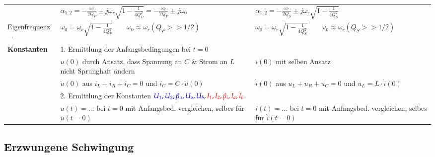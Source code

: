 \begin{tabular}{| p{3.5cm} | p{7.5cm} | p{7cm} |}
		& $\alpha_{1,2} = - \frac{\omega_r}{2 Q_P} \pm j \omega_r \sqrt{1 - \frac{1}{4 Q_P^2}}=-\frac{\omega_r}{2 Q_P} \pm j \omega_0$	
		& $\alpha_{1,2} = - \frac{\omega_r}{2 Q_S} \pm j \omega_r \sqrt{1 - \frac{1}{4 Q_S^2}}$	\\
	\hfill Eigenfrequenz =
		& $\omega_0 = \omega_r \sqrt{1 - \frac{1}{4 Q_P^2}} \qquad \omega_0 \approx \omega_r (Q_P >> 1/2)$ 
		& $\omega_0 = \omega_r \sqrt{1 - \frac{1}{4 Q_S^2}} \qquad \omega_0 \approx\omega_r (Q_S >> 1/2)$\\
		\hline
	\textbf{Konstanten} &
		\multicolumn{2}{l|}{1. Ermittlung der Anfangsbedingungen bei $t = 0$} \\
		& $u(0)$ durch Ansatz, dass Spannung an $C$ \& Strom an $L$ nicht Sprunghaft ändern
		& $i(0)$ mit selben Ansatz\\ 
		& $\dot{u}(0)$ aus $i_L + i_R + i_C = 0$ und $i_C = C\cdot\dot{u}(0)$
		& $\dot{i}(0)$ aus $u_L + u_R + u_C = 0$ und $u_L = L\cdot\dot{i}(0)$\\
		\cline{2-3}
		&\multicolumn{2}{l|}{2. Ermittlung der Konstanten $\textcolor{blue}{U_1,U_2,\beta_u, U_a,U_b},\textcolor{red}{I_1,I_2,\beta_i,I_a,I_b}$ }\\
		& $u(t) = \ldots$ bei $t = 0$ mit Anfangsbed. vergleichen, selbes für $\dot{u}(t=0)$
		& $i(t) = \ldots$ bei $t = 0$ mit Anfangsbed. vergleichen, selbes für $\dot{i}(t=0)$\\
		\hline
	\end{tabular}
	
\renewcommand{\arraystretch}{\arraystretchOriginal}


\subsection{Erzwungene Schwingung}	

